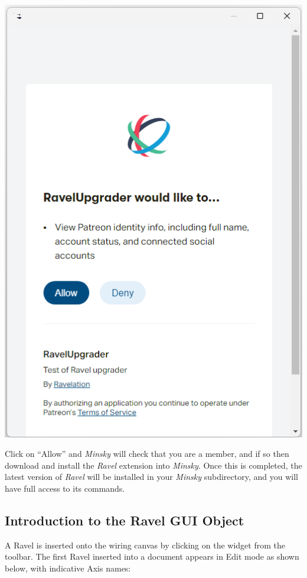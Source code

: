 \includegraphics{images/RavelUpgradeForm}

Click on ``Allow'' and \emph{Minsky} will check that you are a member,
and if so then download and install the \emph{Ravel} extension into
\emph{Minsky}. Once this is completed, the latest version of \emph{Ravel
}will be installed in your \emph{Minsky }subdirectory, and you will
have full access to its commands.

\subsection{Introduction to the Ravel GUI Object}

\label{Ravel-GUI Object}

A Ravel is inserted onto the wiring canvas by clicking on the widget
from the toolbar. The first Ravel inserted into a document appears
in Edit mode as shown below, with indicative Axis names:

